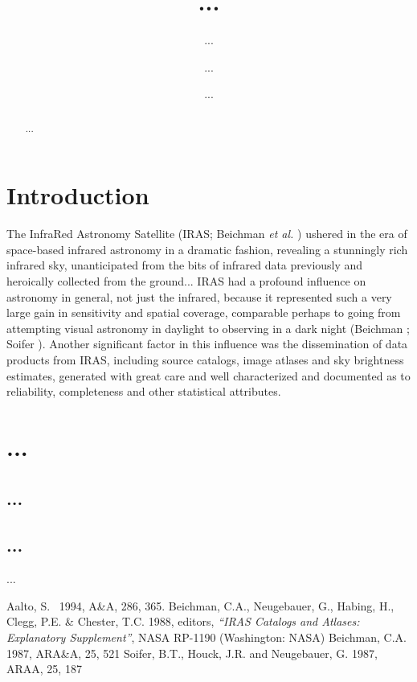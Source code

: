 \documentclass{eas}
\begin{document}
\title{...} 
%
\author{...}\address{...}
\author{...}\address{...}
\author{...}\address{...}
%
%
\begin{abstract}
...
\end{abstract}
%
\maketitle
\section{Introduction}
The InfraRed Astronomy Satellite (IRAS; Beichman {\em et al.\/} \cite{Bei}) 
ushered in the era of space-based infrared astronomy in a dramatic fashion, 
revealing a stunningly rich infrared sky, unanticipated from the bits of 
infrared data previously and heroically collected from the ground...
IRAS had a profound influence on
astronomy in general, not just the infrared, because it represented such a
very large gain in sensitivity and spatial coverage, comparable perhaps to
going from attempting visual astronomy in daylight to observing in a dark
night (Beichman \cite{ref1987}; Soifer \etal \cite{so1987}).  Another
significant factor in this influence was the  dissemination
of data products from IRAS, including source catalogs, image atlases and sky
brightness estimates, generated with great care and well characterized and
documented as to reliability, completeness and other statistical
attributes.
\section{...}
\subsection{...}
\subsection{...}
...
\begin{thebibliography}{99}
 Aalto, S. \etal\  1994, A\&A, 286, 365.
 Beichman, C.A., Neugebauer, G., Habing,
   H., Clegg, P.E. \& Chester, T.C. 1988, editors, {\it ``IRAS Catalogs and
   Atlases: Explanatory Supplement''}, NASA RP-1190 (Washington: NASA)
 Beichman, C.A. 1987, ARA\&A, 25, 521
 Soifer, B.T., Houck, J.R. and Neugebauer, G. 1987, ARAA, 25, 187
\end{thebibliography}
\end{document}
